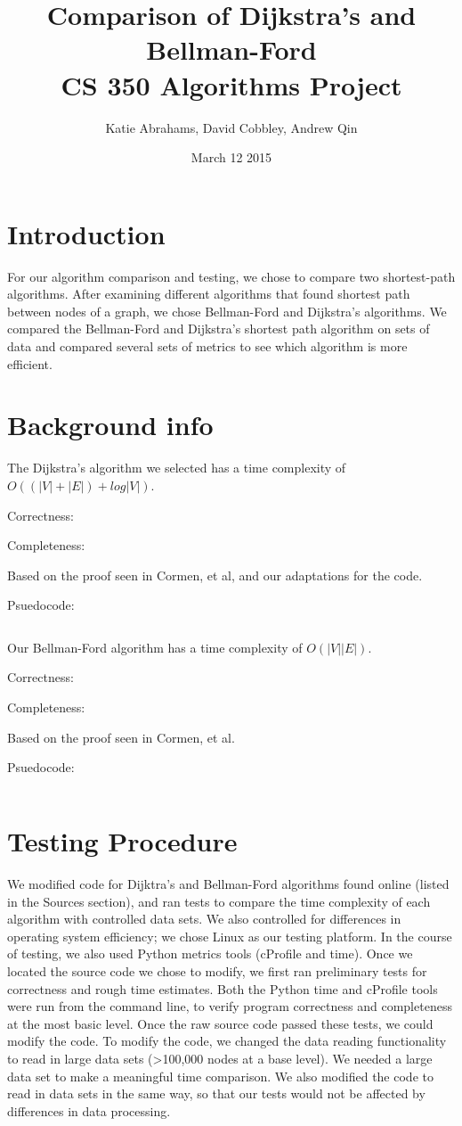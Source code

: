 \documentclass{article}
\title{Comparison of Dijkstra's and Bellman-Ford \\ CS 350 Algorithms Project}
\author{Katie Abrahams, David Cobbley, Andrew Qin}
\date{March 12 2015}
\begin{document}
\maketitle

\section{Introduction}
For our algorithm comparison and testing, we chose to compare two shortest-path algorithms.  After examining different algorithms that found shortest path between nodes of a graph, we chose Bellman-Ford and Dijkstra's algorithms.
We compared the Bellman-Ford and Dijkstra's shortest path algorithm on sets of data and compared several sets of metrics to see which algorithm is more efficient.

\section{Background info}
The Dijkstra's algorithm we selected has a time complexity of $O((|V|+|E|)+log|V|)$.

Correctness: 

Completeness:

Based on the proof seen in Cormen, et al, and our adaptations for the code.

Psuedocode:
\begin{verbatim}

\end{verbatim}

Our Bellman-Ford algorithm has a time complexity of $O(|V||E|)$.

Correctness:

Completeness:

Based on the proof seen in Cormen, et al.

Psuedocode:
\begin{verbatim}

\end{verbatim}
\section{Testing Procedure}
We modified code for Dijktra's and Bellman-Ford algorithms found online (listed in the Sources section), and ran tests to compare the time complexity of each algorithm with controlled data sets.  We also controlled for differences in operating system efficiency; we chose Linux as our testing platform.  In the course of testing, we also used Python metrics tools (cProfile and time).  Once we located the source code we chose to modify, we first ran preliminary tests for correctness and rough time estimates.  Both the Python time and cProfile tools were run from the command line, to verify program correctness and completeness at the most basic level.  Once the raw source code passed these tests, we could modify the code.
To modify the code, we changed the data reading functionality to read in large data sets (>100,000 nodes at a base level).  We needed a large data set to make a meaningful time comparison.
 We also modified the code to read in data sets in the same way, so that our tests would not be affected by differences in data processing.
\end{document}
